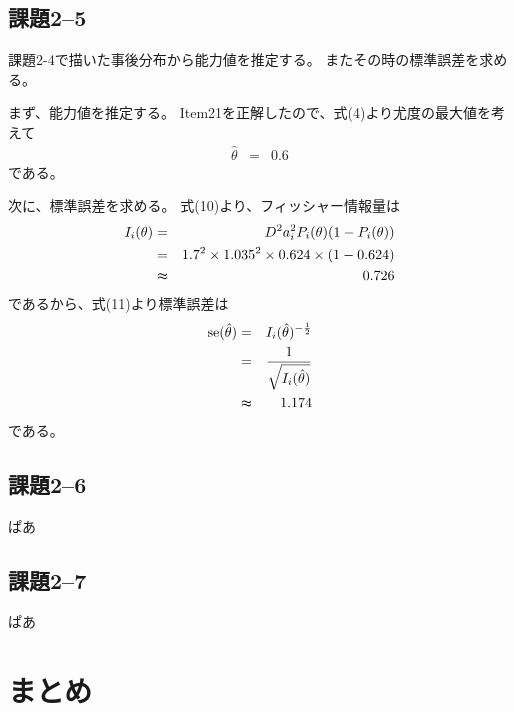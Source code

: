 \documentclass[12pt]{jarticle}
\begin{document}
\subsection{課題2–5}
\begin{shadebox}
    課題2-4で描いた事後分布から能力値を推定する。
    またその時の標準誤差を求める。
\end{shadebox}

まず、能力値を推定する。
Item21を正解したので、式(4)より尤度の最大値を考えて
\begin{eqnarray}
    \hat{\theta}&=&0.6 \nonumber
\end{eqnarray}
である。

次に、標準誤差を求める。
式(10)より、フィッシャー情報量は
\begin{eqnarray}
    I_i(\theta)&=&D^2a_i^2 P_i(\theta)(1-P_i(\theta)) \nonumber\\
    &=&1.7^2 \times 1.035^2\times 0.624\times (1-0.624) \nonumber\\
    &\thickapprox& 0.726 \nonumber
\end{eqnarray}
であるから、式(11)より標準誤差は
\begin{eqnarray}
    {\rm se}(\hat{\theta})&=&I_i(\hat{\theta})^{-\frac{1}{2}} \nonumber\\
    &=&\frac{1}{\sqrt{I_i(\hat{\theta})}}\nonumber\\
    &\thickapprox&1.174\nonumber
\end{eqnarray}
である。

\clearpage
\subsection{課題2–6}
\begin{shadebox}
    ぱあ
\end{shadebox}
\subsection{課題2–7}
\begin{shadebox}
    ぱあ
\end{shadebox}

\section{まとめ}


\begin{thebibliography}{99}
    \label{sannkoubunnkenn_chapter}
\end{thebibliography}

\clearpage
\appendix
\end{document}
